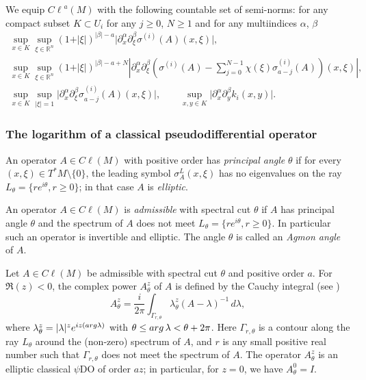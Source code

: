 \documentclass[11pt]{article}
\def \Cl {{C\ell}}
\begin{document}
We equip ${\Cl}^{a}(M)$ with the following countable set of semi-norms: for any compact subset $K\subset U_i$ for any $j\geq 0$, $N\geq 1$ and for any multiindices $\alpha$, $\beta$
\begin{gather*}
 \sup\limits_{x\in K}\sup\limits_{
  \xi\in\mathbb{R}^n}(1+\vert\xi\vert)^{\vert\beta\vert-a}
  \big|\partial_x^{\alpha}\partial_{\xi}^{\beta} \sigma^{(i)}(A)(x,\xi)\big|,\\
 \sup\limits_{x\in K}\sup\limits_{
  \xi\in\mathbb{R}^n}(1+\vert\xi\vert)^{\vert\beta\vert-a+N}
  \left|\partial_x^{\alpha}\partial_{\xi}^{\beta} \left(\sigma^{(i)}(A)-\sum_{j=0}^{N-1}\chi(\xi)  \sigma_{a-j}^{(i)}(A)\right)(x,\xi)\right|,\\
 \sup\limits_{x\in K}\sup\limits_{ \vert\xi\vert=1}
  \big|\partial_x^{\alpha}\partial_{\xi}^{\beta}\sigma_{a-j}^{(i)}(A)(x,\xi)\big|,\qquad
 \sup\limits_{x,y\in K}
  \big|\partial_x^{\alpha}\partial_{y}^{\beta} k_i(x,y)\big|.
\end{gather*}

\subsubsection{The logarithm of a classical pseudodif\/ferential operator}

An operator $A \in \Cl(M)$ with positive order has \emph{principal angle} $\theta$ if for every $(x, \xi)\in T^*M\setminus\{0\}$, the leading symbol $\sigma_A^L(x, \xi)$ has no eigenvalues on the ray $L_\theta=\{re^{i\theta}, r\geq 0\}$; in that case $A$ is \emph{elliptic}.
\begin{definition}
An operator $A\in \Cl(M)$ is \emph{admissible} with spectral cut $\theta$ if $A$ has principal angle $\theta$ and the spectrum of $A$ does not meet $L_{\theta}=\{re^{i\theta}, r\geq 0\}$. In particular such an operator is invertible and elliptic. The angle $\theta$ is called an \emph{Agmon angle} of $A$.
\end{definition}
Let $A\in \Cl(M)$ be admissible with spectral cut $\theta$ and positive order $a$. For $\Re(z)<0$, the complex power $A_{\theta}^z$ of $A$ is
def\/ined by the Cauchy integral (see \cite{seeley})
\[
A_\theta^{z}=\frac{i}{2\pi} \int_{\Gamma_{r,\theta}} \lambda_\theta^{z} (A-\lambda)^{-1}\, d\lambda,
\]
where $\lambda_\theta^z= \vert \lambda\vert^z e^{iz {(\rm arg}\lambda)}$ with  $\theta\leq {\rm arg}\,\lambda<\theta+2\pi$. Here $\Gamma_{r,\theta}$ is a contour along the ray $L_\theta$ around the (non-zero) spectrum of $A$, and $r$ is any small positive real number such that $\Gamma_{r,\theta}$ does not meet the spectrum of $A$. The operator $A_{\theta}^z$ is an elliptic classical $\psi$DO of order $az$; in particular, for $z=0$, we have $ A_{\theta}^0 = I$.
\end{document}
